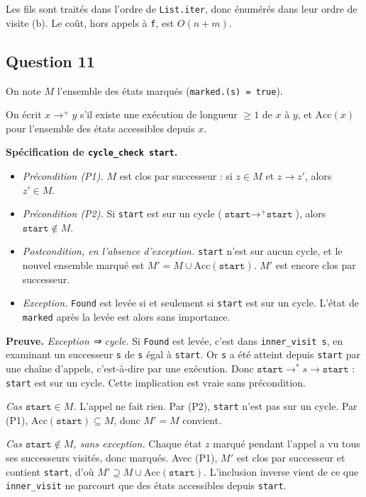 \documentclass[11pt,a4paper]{article}
\providecommand{\tightlist}{\setlength{\itemsep}{0pt}\setlength{\parskip}{0pt}}
\begin{document}
Les fils sont traités dans l'ordre de \texttt{List.iter}, donc énumérés dans leur ordre de visite (b). Le coût, hors appels à \texttt{f}, est \(O(n+m)\).

\hypertarget{question-11}{%
\subsection{Question 11}\label{question-11}}

On note \(M\) l'ensemble des états marqués (\texttt{marked.(\allowbreak{}s)\allowbreak{}\ =\allowbreak{}\ true}).

On écrit \(x\to^+y\) s'il existe une exécution de longueur \(\ge1\) de \(x\) à \(y\), et \(\mathrm{Acc}(x)\) pour l'ensemble des états accessibles depuis \(x\).

\textbf{Spécification de \texttt{cycle\_check\ start}.}

\begin{itemize}
\tightlist
\item
  \emph{Précondition (P1).} \(M\) est clos par successeur : si \(z\in M\) et \(z\to z'\), alors \(z'\in M\).
\item
  \emph{Précondition (P2).} Si \texttt{start} est sur un cycle (\(\texttt{start}\to^+\texttt{start}\)), alors \(\texttt{start}\notin M\).
\item
  \emph{Postcondition, en l'absence d'exception.} \texttt{start} n'est sur aucun cycle, et le nouvel ensemble marqué est \(M'=M\cup\mathrm{Acc}(\texttt{start})\). \(M'\) est encore clos par successeur.
\item
  \emph{Exception.} \texttt{Found} est levée si et seulement si \texttt{start} est sur un cycle. L'état de \texttt{marked} après la levée est alors sans importance.
\end{itemize}

\textbf{Preuve.} \emph{Exception ⇒ cycle.} Si \texttt{Found} est levée, c'est dans \texttt{inner\_visit\ s}, en examinant un successeur \texttt{s\textquotesingle{}} de \texttt{s} égal à \texttt{start}. Or \texttt{s} a été atteint depuis \texttt{start} par une chaîne d'appels, c'est-à-dire par une exécution. Donc \(\texttt{start}\to^*s\to\texttt{start}\) : \texttt{start} est sur un cycle. Cette implication est vraie sans précondition.

\emph{Cas \(\texttt{start}\in M\).} L'appel ne fait rien. Par (P2), \texttt{start} n'est pas sur un cycle. Par (P1), \(\mathrm{Acc}(\texttt{start})\subseteq M\), donc \(M'=M\) convient.

\emph{Cas \(\texttt{start}\notin M\), sans exception.} Chaque état \(z\) marqué pendant l'appel a vu tous ses successeurs visités, donc marqués. Avec (P1), \(M'\) est clos par successeur et contient \texttt{start}, d'où \(M'\supseteq M\cup\mathrm{Acc}(\texttt{start})\). L'inclusion inverse vient de ce que \texttt{inner\_visit} ne parcourt que des états accessibles depuis \texttt{start}.
\end{document}
